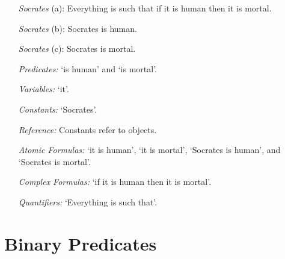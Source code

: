 \documentclass[a4paper, 11pt]{article} %
\begin{document}
\begin{enumerate}
  \item[\textit{Socrates} (a):] Everything is such that if it is human then it is mortal.
  \item[\textit{Socrates} (b):] Socrates is human.
  \item[\textit{Socrates} (c):] Socrates is mortal.
  \item[\it Predicates:] 
    `is human' and 
    `is mortal'.
  \item[\it Variables:] `it'. 
  \item[\it Constants:] `Socrates'. 
  \item[\it Reference:] Constants refer to objects.
  \item[\it Atomic Formulas:] 
    `it is human',
    `it is mortal',
    `Socrates is human', and
    `Socrates is mortal'. 
  \item[\it Complex Formulas:] `if it is human then it is mortal'.
  \item[\it Quantifiers:] `Everything is such that'.
\end{enumerate}




\section*{Binary Predicates}
\end{document}
